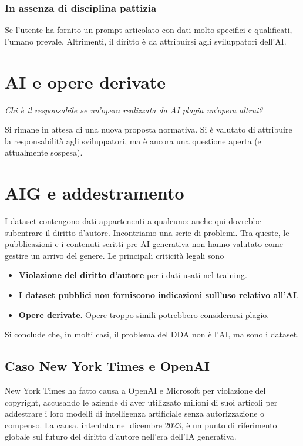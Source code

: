 \subsubsection{In assenza di disciplina pattizia}
Se l'utente ha fornito un prompt articolato con dati molto specifici e qualificati, l'umano prevale. Altrimenti, il diritto è da attribuirsi agli sviluppatori dell'AI.

\section{AI e opere derivate}
\begin{center}
	\textit{Chi è il responsabile se un'opera realizzata da AI plagia un'opera altrui?}
\end{center}

Si rimane in attesa di una nuova proposta normativa. Si è valutato di attribuire la responsabilità agli sviluppatori, ma è ancora una questione aperta (e attualmente sospesa).

\section{AIG e addestramento}
I dataset contengono dati appartenenti a qualcuno: anche qui dovrebbe subentrare il diritto d'autore. Incontriamo una serie di problemi. Tra queste, le pubblicazioni e i contenuti scritti pre-AI generativa non hanno valutato come gestire un arrivo del genere. Le principali criticità legali sono
\begin{itemize}
	\item \textbf{Violazione del diritto d'autore} per i dati usati nel training.
	\item \textbf{I dataset pubblici non forniscono indicazioni sull'uso relativo all'AI}.
	\item \textbf{Opere derivate}. Opere troppo simili potrebbero considerarsi plagio.
\end{itemize}
Si conclude che, in molti casi, il problema del DDA non è l'AI, ma sono i dataset.

\subsection{Caso New York Times e OpenAI}
New York Times ha fatto causa a OpenAI e Microsoft per violazione del copyright, accusando le aziende di aver utilizzato milioni di suoi articoli per addestrare i loro modelli di intelligenza artificiale senza autorizzazione o compenso. La causa, intentata nel dicembre 2023, è un punto di riferimento globale sul futuro del diritto d'autore nell'era dell'IA generativa. 

